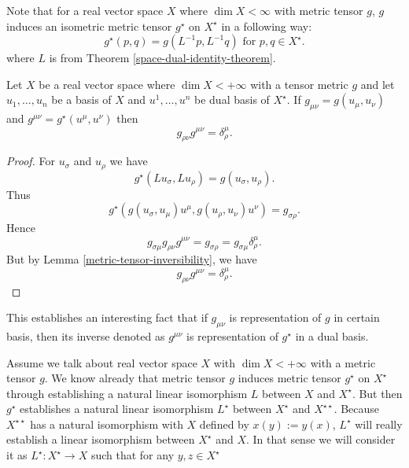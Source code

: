 \documentclass[main.tex]{subfiles}
\begin{document}
Note that for a real vector space $X$ where $\dim X < \infty$ with metric tensor $g$, $g$ induces an isometric metric tensor $g^\star$ on $X^\star$ in a following way:
\begin{equation}
g^\star (p, q) = g(L^{-1}p, L^{-1}q) \text{ for } p, q\in X^\star.
\end{equation}
where $L$ is from Theorem \ref{space-dual-identity-theorem}.

\begin{theorem}
\label{raise-metric-indices}
Let $X$ be a real vector space where $\dim X < +\infty$ with a tensor metric $g$ and let $u_1, \dots, u_n$ be a basis of $X$ and $u^1, \dots, u^n$ be dual basis of $X^\star$. If $g_{\mu\nu} = g(u_\mu, u_\nu)$ and $g^{\mu\nu} = g^\star(u^\mu, u^\nu)$ then
\begin{equation}
g_{\rho\nu} g^{\mu\nu} = \delta^\mu_\rho.
\end{equation}
\end{theorem}
\begin{proof}
For $u_\sigma$ and $u_\rho$ we have
\begin{equation}
g^\star(Lu_\sigma, Lu_\rho) = g(u_\sigma, u_\rho).
\end{equation}
Thus
\begin{equation}
g^\star(g(u_\sigma, u_\mu)u^\mu, g(u_\rho, u_\nu)u^\nu) = g_{\sigma\rho}. 
\end{equation}
Hence
\begin{equation}
g_{\sigma\mu}g_{\rho\nu}g^{\mu\nu} = g_{\sigma \rho} = g_{\sigma\mu} \delta^\mu_\rho.
\end{equation}
But by Lemma \ref{metric-tensor-inversibility}, we have
\begin{equation}
g_{\rho\nu}g^{\mu\nu} = \delta^\mu_\rho.
\end{equation}
\end{proof}

This establishes an interesting fact that if $g_{\mu\nu}$ is representation of $g$ in certain basis, then its inverse denoted as $g^{\mu\nu}$ is representation of $g^\star$ in a dual basis.

Assume we talk about real vector space $X$ with $\dim X < +\infty$ with a metric tensor $g$. We know already that metric tensor $g$ induces metric tensor $g^\star$ on $X^\star$ through establishing a natural linear isomorphism $L$ between $X$ and $X^\star$. But then $g^\star$ establishes a natural linear isomorphism $L^\star$ between $X^\star$ and $X^{\star\star}$. Because $X^{\star\star}$ has a natural isomorphism with $X$ defined by $x(y):=y(x)$, $L^\star$ will really establish a linear isomorphism between $X^\star$ and $X$. In that sense we will consider it as $L^\star:X^\star \to X$ such that for any $y, z\in X^\star$
\end{document}
